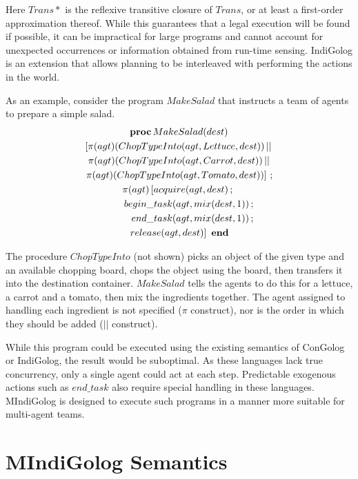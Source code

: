 \documentclass{llncs}
\begin{document}
Here $Trans*$ is the reflexive transitive closure of $Trans$, or at least a
first-order approximation thereof.
While this guarantees that a legal execution
will be found if possible, it can be impractical for large programs
and cannot account for unexpected occurrences or information obtained
from run-time sensing.  IndiGolog \cite{giacomo99indigolog} is an extension
that allows planning to be interleaved with performing the actions in the world.

As an example, consider the program $MakeSalad$ that instructs a team of
agents to prepare a simple salad.
\begin{multline}
\label{eqn:MakeSalad}
\mathbf{proc}\,MakeSalad(dest)\\
\left[\pi(agt)(ChopTypeInto(agt,Lettuce,dest))\,||\right.\\
\pi(agt)(ChopTypeInto(agt,Carrot,dest))\,||\\
\left.\pi(agt)(ChopTypeInto(agt,Tomato,dest))\right]\,;\\
\pi(agt)\left[acquire(agt,dest)\,;\right.\\
 \shoveright{begin\_task(agt,mix(dest,1))\,;\quad}\\
 \shoveright{end\_task(agt,mix(dest,1))\,;\quad}\\
 \left.release(agt,dest)\right]\,\,\mathbf{end}
\end{multline}

The procedure $ChopTypeInto$ (not shown) picks an object of the given
type and an available chopping board, chops the object using the board,
then transfers it into the destination container. $MakeSalad$ tells
the agents to do this for a lettuce, a carrot and a tomato, then mix
the ingredients together. The agent assigned to handling
each ingredient is not specified ($\pi$ construct), nor is the order in which
they should be added ($||$ construct). 

While this program could be executed using the existing semantics of ConGolog
or IndiGolog, the result would be suboptimal.  As these languages lack true
concurrency, only a single agent could act at each step.
Predictable exogenous actions such
as $end\_task$ also require special handling in these languages.  MIndiGolog
is designed to execute such programs in a manner more suitable for multi-agent
teams.

\section{MIndiGolog Semantics}
\end{document}
